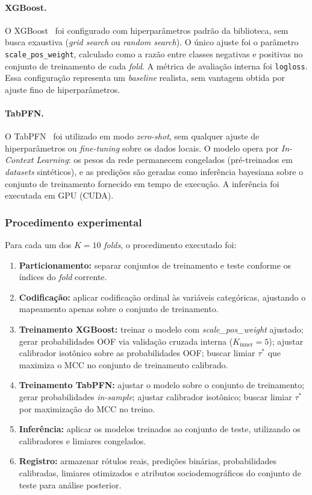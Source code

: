 \documentclass[12pt]{article}
\begin{document}
\paragraph{XGBoost.} O XGBoost~\cite{chen:2016} foi configurado com hiperparâmetros padrão da biblioteca, sem busca exaustiva (\textit{grid search} ou \textit{random search}). O único ajuste foi o parâmetro \texttt{scale\_pos\_weight}, calculado como a razão entre classes negativas e positivas no conjunto de treinamento de cada \textit{fold}. A métrica de avaliação interna foi \texttt{logloss}. Essa configuração representa um \textit{baseline} realista, sem vantagem obtida por ajuste fino de hiperparâmetros.

\paragraph{TabPFN.} O TabPFN~\cite{hollmann:2022} foi utilizado em modo \textit{zero-shot}, sem qualquer ajuste de hiperparâmetros ou \textit{fine-tuning} sobre os dados locais. O modelo opera por \textit{In-Context Learning}: os pesos da rede permanecem congelados (pré-treinados em \textit{datasets} sintéticos), e as predições são geradas como inferência bayesiana sobre o conjunto de treinamento fornecido em tempo de execução. A inferência foi executada em GPU (CUDA).

\subsubsection{Procedimento experimental}

Para cada um dos $K=10$ \textit{folds}, o procedimento executado foi:

\begin{enumerate}
  \item \textbf{Particionamento:} separar conjuntos de treinamento e teste conforme os índices do \textit{fold} corrente.
  \item \textbf{Codificação:} aplicar codificação ordinal às variáveis categóricas, ajustando o mapeamento apenas sobre o conjunto de treinamento.
  \item \textbf{Treinamento XGBoost:} treinar o modelo com \textit{scale\_pos\_weight} ajustado; gerar probabilidades OOF via validação cruzada interna ($K_{\text{inner}}=5$); ajustar calibrador isotônico sobre as probabilidades OOF; buscar limiar $\tau^*$ que maximiza o MCC no conjunto de treinamento calibrado.
  \item \textbf{Treinamento TabPFN:} ajustar o modelo sobre o conjunto de treinamento; gerar probabilidades \textit{in-sample}; ajustar calibrador isotônico; buscar limiar $\tau^*$ por maximização do MCC no treino.
  \item \textbf{Inferência:} aplicar os modelos treinados ao conjunto de teste, utilizando os calibradores e limiares congelados.
  \item \textbf{Registro:} armazenar rótulos reais, predições binárias, probabilidades calibradas, limiares otimizados e atributos sociodemográficos do conjunto de teste para análise posterior.
\end{enumerate}  
\end{document}
